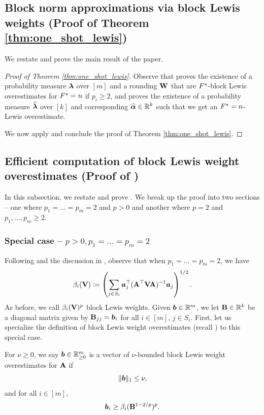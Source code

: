 \documentclass[11pt]{article}
\numberwithin{equation}{section}
\begin{document}
\subsection{Block norm approximations via block Lewis weights (Proof of Theorem \ref{thm:one_shot_lewis})}
\label{sec:lewis}

We restate and prove the main result of the paper.
\oneshotlewis*
\begin{proof}[Proof of Theorem \ref{thm:one_shot_lewis}]
Observe that  proves the existence of a probability measure $\bm{\lambda}$ over $[m]$ and a rounding $\mathbf{W}$ that are $F^{\star}$-block Lewis overestimates for $F^{\star} = n$ if $p_i \ge 2$, and  proves the existence of a probability measure $\widehat{\bm{\lambda}}$ over $[k]$ and corresponding $\widehat{\bm{\alpha}} \in \mathbb{R}^k$ such that we get an $F^{\star} = n$-Lewis overestimate.

We now apply  and conclude the proof of Theorem \ref{thm:one_shot_lewis}.
\end{proof}

\subsection{Efficient computation of block Lewis weight overestimates (Proof of \texorpdfstring{}{Theorem 2})}
\label{sec:alg}

In this subsection, we restate and prove .
\computeblw*
We break up the proof into two sections -- one where $p_1=\dots=p_m=2$ and $p > 0$ and another where $p=2$ and $p_1,\dots,p_m \ge 2$.

\subsubsection{Special case -- \texorpdfstring{$p > 0, p_1=\dots=p_m=2$}{p>0,p1=...=pm=2}}

Following  and the discussion in , observe that when $p_1=\dots=p_m=2$, we have \[\beta_i(\mathbf{V}) \coloneqq \left(\sum_{j \in S_i} \bm{a}_j^{\top}(\mathbf{A}^{\top}\mathbf{V}\mathbf{A})^{-1}\bm{a}_j\right)^{1/2}.\]
As before, we call \(\beta_i(\mathbf{V})^p\) block Lewis weights.
Given \(\bm{b} \in \mathbb{R}^m\), we let \(\mathbf{B} \in \mathbb{R}^{k}\) be a diagonal matrix given by
\(\mathbf{B}_{jj} = \bm{b}_i\) for all \(i \in [m]\), \(j \in S_i\).
First, let us specialize the definition of block Lewis weight overestimates (recall ) to this special case.
\begin{definition}\label{def:lev_score_over}
    For \(\nu \ge 0\), we say \(\bm{b} \in \mathbb{R}_{\geq 0}^m\) is a vector of \(\nu\)-bounded block Lewis weight overestimates for \(\mathbf{A}\) if
    \[\|\bm{b}\|_1 \le \nu,\]
    and for all \(i \in [m]\),
    \[\bm{b}_i \ge \beta_i(\mathbf{B}^{1-2/p})^p.\]
\end{definition}
\end{document}
